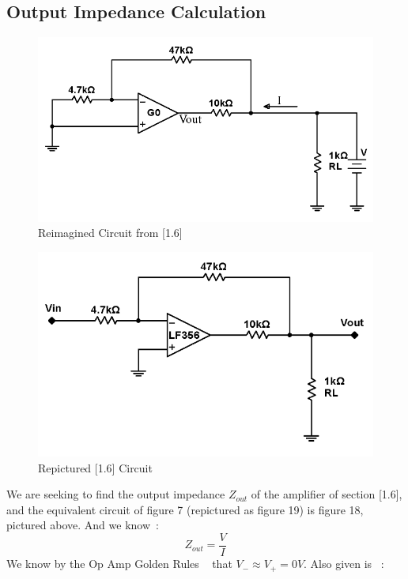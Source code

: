 \documentclass{article}
\begin{document}
\subsection{Output Impedance Calculation}
    \begin{figure}[H]
        \centering
        \includegraphics[scale = 0.5]{13.png}
        \caption{Reimagined Circuit from [1.6] ~\cite{webfig}}
        \label{fig:my_label}
    \end{figure}
    \begin{figure}[H]
        \centering
        \includegraphics[scale = 0.5]{6.png}
        \caption{Repictured [1.6] Circuit ~\cite{webfig}}
        \label{fig:my_label}
    \end{figure}
    We are seeking to find the output impedance $Z_{out}$ of the amplifier of section [1.6], and the equivalent circuit of figure 7 (repictured as figure 19) is figure 18, pictured above. And we know~\cite{webfig}:
    \begin{equation}
        Z_{out} = \frac{V}{I}
    \end{equation}
    We know by the Op Amp Golden Rules ~\cite{webfig} that $V_- \approx V_+ = 0V$. Also given is ~\cite{webfig}:
\end{document}
